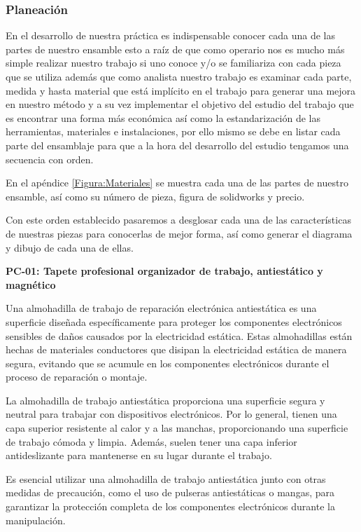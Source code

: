     \subsubsection{Planeación}
    
    En el desarrollo de nuestra práctica es indispensable conocer cada una de las partes de nuestro ensamble esto a raíz de que como operario nos es mucho más simple realizar nuestro trabajo si uno conoce y/o se familiariza con cada pieza que se utiliza además que como analista nuestro trabajo es examinar cada parte, medida y hasta material que está implícito en el trabajo para generar una mejora en nuestro método y a su vez implementar el objetivo del estudio del trabajo que es encontrar una forma más económica así como la estandarización de las herramientas, materiales e instalaciones, por ello mismo se debe en listar cada parte del ensamblaje para que a la hora del desarrollo del estudio tengamos una secuencia con orden.
    
    En el apéndice \ref{Figura:Materiales} se muestra cada una de las partes de nuestro ensamble, así como su número de pieza, figura de solidworks y precio.
    
    Con este orden establecido pasaremos a desglosar cada una de las características de nuestras piezas para conocerlas de mejor forma, así como generar  el diagrama y dibujo de cada una de ellas.
    
    \textbf{PC-01: Tapete profesional organizador de trabajo, antiestático y magnético}
    
    Una almohadilla de trabajo de reparación electrónica antiestática es una superficie diseñada específicamente para proteger los componentes electrónicos sensibles de daños causados por la electricidad estática. Estas almohadillas están hechas de materiales conductores que disipan la electricidad estática de manera segura, evitando que se acumule en los componentes electrónicos durante el proceso de reparación o montaje.
    
    La almohadilla de trabajo antiestática proporciona una superficie segura y neutral para trabajar con dispositivos electrónicos. Por lo general, tienen una capa superior resistente al calor y a las manchas, proporcionando una superficie de trabajo cómoda y limpia. Además, suelen tener una capa inferior antideslizante para mantenerse en su lugar durante el trabajo.
    
    Es esencial utilizar una almohadilla de trabajo antiestática junto con otras medidas de precaución, como el uso de pulseras antiestáticas o mangas, para garantizar la protección completa de los componentes electrónicos durante la manipulación.
    
